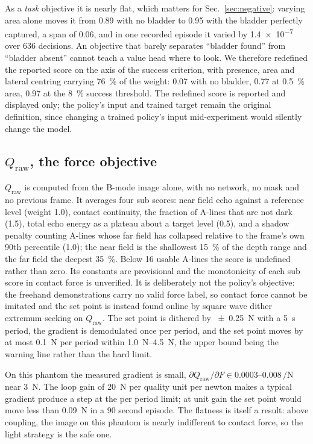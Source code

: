 \documentclass[conference]{IEEEtran}
\begin{document}
As a \emph{task} objective it is nearly flat, which matters for
Sec.~\ref{sec:negative}: varying area alone moves it from \num{0.89} with no
bladder to \num{0.95} with the bladder perfectly captured, a span of
\num{0.06}, and in one recorded episode it varied by \num{1.4e-7} over 636
decisions. An objective that barely separates ``bladder found'' from ``bladder
absent'' cannot teach a value head where to look. We therefore redefined the
reported score on the axis of the success criterion, with presence, area and
lateral centring carrying \SI{76}{\percent} of the weight: \num{0.07} with no
bladder, \num{0.77} at \SI{0.5}{\percent} area, \num{0.97} at the
\SI{8}{\percent} success threshold. The redefined score is reported and
displayed only; the policy's input and trained target remain the original
definition, since changing a trained policy's input mid-experiment would
silently change the model.

\subsection{$Q_\mathrm{raw}$, the force objective}

$Q_\mathrm{raw}$ is computed from the B-mode image alone, with no network, no
mask and no previous frame. It averages four sub scores: near field echo against
a reference level (weight \num{1.0}), contact continuity, the fraction of
A-lines that are not dark (\num{1.5}), total echo energy as a plateau about a
target level (\num{0.5}), and a shadow penalty counting A-lines whose far field
has collapsed relative to the frame's own 90th percentile (\num{1.0}); the near
field is the shallowest \SI{15}{\percent} of the depth range and the far field
the deepest \SI{35}{\percent}. Below 16 usable A-lines the score is undefined
rather than zero. Its constants are provisional and the monotonicity of each sub
score in contact force is unverified. It is deliberately not the policy's
objective: the freehand demonstrations carry no valid force label, so contact
force cannot be imitated and the set point is instead found online by square
wave dither extremum seeking on $Q_\mathrm{raw}$. The
set point is dithered by \SI{\pm 0.25}{\newton} with a \SI{5}{\second} period,
the gradient is demodulated once per period, and the set point moves by at most
\SI{0.1}{\newton} per period within \SIrange{1.0}{4.5}{\newton}, the upper bound
being the warning line rather than the hard limit.

On this phantom the measured gradient is small,
$\partial Q_\mathrm{raw} / \partial F \in
\numrange{0.0003}{0.008}\,\si{\per\newton}$ near \SI{3}{\newton}. The loop gain of \SI{20}{\newton} per quality unit per newton
makes a typical gradient produce a step at the per period limit; at unit gain
the set point would move less than \SI{0.09}{\newton} in a 90 second episode.
The flatness is itself a result: above coupling, the image on this phantom is
nearly indifferent to contact force, so the light strategy is the safe one.
\end{document}
